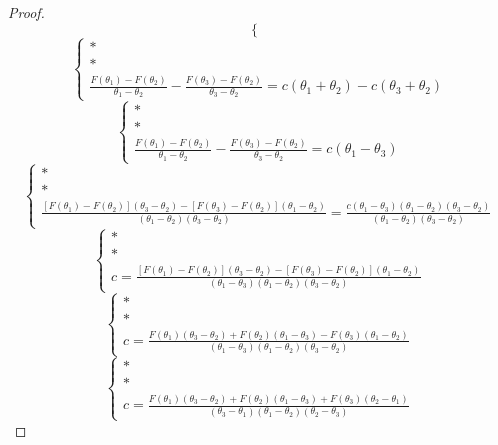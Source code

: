 \begin{proof}
\[\begin{cases}
        \end{cases}
    \]
    \[
        \begin{cases}
            * \\
            * \\
            \frac{F(\theta_1) - F(\theta_2)}{\theta_1 - \theta_2} - \frac{F(\theta_3) - F(\theta_2)}{\theta_3 - \theta_2} = c(\theta_1 + \theta_2) - c(\theta_3 + \theta_2)
        \end{cases}
    \]
    \[
        \begin{cases}
            * \\
            * \\
            \frac{F(\theta_1) - F(\theta_2)}{\theta_1 - \theta_2} - \frac{F(\theta_3) - F(\theta_2)}{\theta_3 - \theta_2} = c(\theta_1 - \theta_3)
        \end{cases}
    \]
    \[
        \begin{cases}
            * \\
            * \\
            \frac{[F(\theta_1) - F(\theta_2)](\theta_3 - \theta_2) - [F(\theta_3) - F(\theta_2)](\theta_1 - \theta_2)}{(\theta_1 - \theta_2)(\theta_3 - \theta_2)} = \frac{c(\theta_1 - \theta_3)(\theta_1 - \theta_2)(\theta_3 - \theta_2)}{(\theta_1 - \theta_2)(\theta_3 - \theta_2)}
        \end{cases}
    \]
    \[
        \begin{cases}
            * \\
            * \\
            c = \frac{[F(\theta_1) - F(\theta_2)](\theta_3 - \theta_2) - [F(\theta_3) - F(\theta_2)](\theta_1 - \theta_2)}{(\theta_1 - \theta_3)(\theta_1 - \theta_2)(\theta_3 - \theta_2)}
        \end{cases}
    \]
    \[
        \begin{cases}
            * \\
            * \\
            c = \frac{F(\theta_1)(\theta_3 - \theta_2) + F(\theta_2)(\theta_1 - \theta_3) - F(\theta_3)(\theta_1 - \theta_2)}{(\theta_1 - \theta_3)(\theta_1 - \theta_2)(\theta_3 - \theta_2)}
        \end{cases}
    \]
    \[
        \begin{cases}
            * \\
            * \\
            c = \frac{F(\theta_1)(\theta_3 - \theta_2) + F(\theta_2)(\theta_1 - \theta_3) + F(\theta_3)(\theta_2 - \theta_1)}{(\theta_3 - \theta_1)(\theta_1 - \theta_2)(\theta_2 - \theta_3)}

\end{cases}\]
\end{proof}
